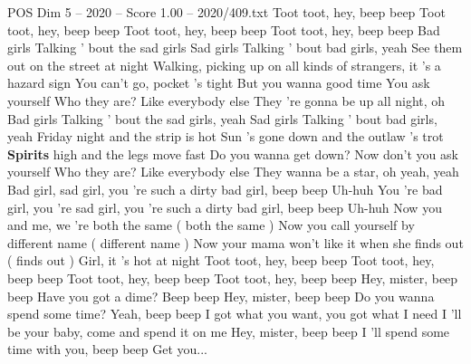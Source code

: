 \begin{textsample}{POS Dim 5 – 2020 – Score 1.00 – 2020/409.txt}  \label{ex:f5_pos_022}
Toot toot, hey, beep beep Toot toot, hey, beep beep Toot toot, hey, beep beep Toot toot, hey, beep beep Bad girls Talking ' bout the sad girls Sad girls Talking ' bout bad girls, yeah See them out on the street at night Walking, picking up on all kinds of strangers, it 's a hazard sign You can't go, pocket 's tight But you wanna good time You ask yourself Who they are?
Like everybody else They 're gonna be up all night, oh Bad girls Talking ' bout the sad girls, yeah Sad girls Talking ' bout bad girls, yeah Friday night and the strip is hot Sun 's gone down and the outlaw 's trot \textbf{Spirits} high and the legs move fast Do you wanna get down?
Now don't you ask yourself Who they are?
Like everybody else They wanna be a star, oh yeah, yeah Bad girl, sad girl, you 're such a dirty bad girl, beep beep Uh-huh You 're bad girl, you 're sad girl, you 're such a dirty bad girl, beep beep Uh-huh Now you and me, we 're both the same ( both the same ) Now you call yourself by different name ( different name ) Now your mama won't like it when she finds out ( finds out ) Girl, it 's hot at night Toot toot, hey, beep beep Toot toot, hey, beep beep Toot toot, hey, beep beep Toot toot, hey, beep beep Hey, mister, beep beep Have you got a dime?
Beep beep Hey, mister, beep beep Do you wanna spend some time?
Yeah, beep beep I got what you want, you got what I need I 'll be your baby, come and spend it on me Hey, mister, beep beep I 'll spend some time with you, beep beep Get you...

\end{textsample}
